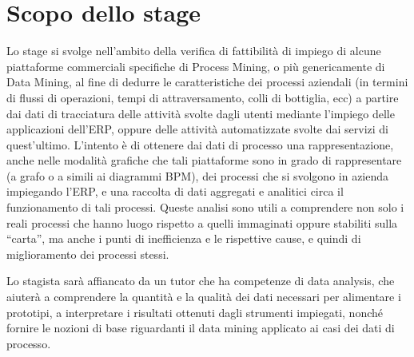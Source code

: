 \section*{Scopo dello stage}
Lo stage si svolge nell’ambito della verifica di fattibilità di impiego di alcune piattaforme commerciali specifiche di Process Mining, o più genericamente di Data Mining, al fine di dedurre le caratteristiche dei processi aziendali (in termini di flussi di operazioni, tempi di attraversamento, colli di bottiglia, ecc) a partire dai dati di tracciatura delle attività svolte dagli utenti mediante l’impiego delle applicazioni dell’ERP, oppure delle attività automatizzate svolte dai servizi di quest’ultimo.
L’intento è di ottenere dai dati di processo una rappresentazione, anche nelle modalità grafiche che tali piattaforme sono in grado di rappresentare (a grafo o a simili ai diagrammi BPM), dei processi che si svolgono in azienda impiegando l’ERP, e una raccolta di dati aggregati e analitici circa il funzionamento di tali processi.
Queste analisi sono utili a comprendere non solo i reali processi che hanno luogo rispetto a quelli immaginati oppure stabiliti sulla “carta”, ma anche i punti di inefficienza e le rispettive cause, e quindi di miglioramento dei processi stessi.

Lo stagista sarà affiancato da un tutor che ha competenze di data analysis, che aiuterà a comprendere la quantità e la qualità dei dati necessari per alimentare i prototipi, a interpretare i risultati ottenuti dagli strumenti impiegati, nonché fornire le nozioni di base riguardanti il data mining applicato ai casi dei dati di processo.

